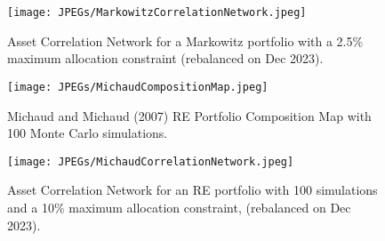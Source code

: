 \documentclass[12pt,letterpaper]{article}
\begin{document}
\begin{figure}
\centering
\texttt{[image: JPEGs/MarkowitzCorrelationNetwork.jpeg]}
\caption{\label{fig:MarkowitzCorrelationNetwork} Asset Correlation Network for a Markowitz portfolio with a 2.5\% maximum allocation constraint (rebalanced on Dec 2023).}
\end{figure}
\clearpage

\begin{figure}
\centering
\texttt{[image: JPEGs/MichaudCompositionMap.jpeg]}
\caption{\label{fig:MichaudCompositionMap} Michaud and Michaud (2007) RE Portfolio Composition Map with 100 Monte Carlo simulations.}
\end{figure}
\clearpage

\begin{figure}
\centering
\texttt{[image: JPEGs/MichaudCorrelationNetwork.jpeg]}
\caption{\label{fig:MichaudCorrelationNetwork} Asset Correlation Network for an RE portfolio with 100 simulations and a 10\% maximum allocation constraint, (rebalanced on Dec 2023).}
\end{figure}
\clearpage


\end{document}
